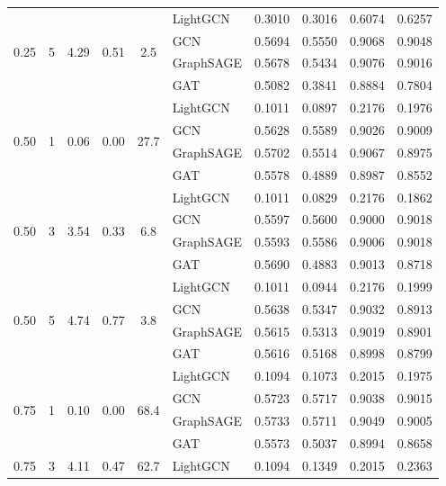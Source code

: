 {\begin{longtable}{cccccl rrrr}
\midrule
\multirow{4}{*}{0.25} & \multirow{4}{*}{5} & \multirow{4}{*}{4.29} & \multirow{4}{*}{0.51} & \multirow{4}{*}{2.5} & LightGCN & 0.3010 & 0.3016 & 0.6074 & 0.6257 \\
 & & & & & GCN & 0.5694 & 0.5550 & 0.9068 & 0.9048 \\
 & & & & & GraphSAGE & 0.5678 & 0.5434 & 0.9076 & 0.9016 \\
 & & & & & GAT & 0.5082 & 0.3841 & 0.8884 & 0.7804 \\
\midrule
\multirow{4}{*}{0.50} & \multirow{4}{*}{1} & \multirow{4}{*}{0.06} & \multirow{4}{*}{0.00} & \multirow{4}{*}{27.7} & LightGCN & 0.1011 & 0.0897 & 0.2176 & 0.1976 \\
 & & & & & GCN & 0.5628 & 0.5589 & 0.9026 & 0.9009 \\
 & & & & & GraphSAGE & 0.5702 & 0.5514 & 0.9067 & 0.8975 \\
 & & & & & GAT & 0.5578 & 0.4889 & 0.8987 & 0.8552 \\
\midrule
\multirow{4}{*}{0.50} & \multirow{4}{*}{3} & \multirow{4}{*}{3.54} & \multirow{4}{*}{0.33} & \multirow{4}{*}{6.8} & LightGCN & 0.1011 & 0.0829 & 0.2176 & 0.1862 \\
 & & & & & GCN & 0.5597 & 0.5600 & 0.9000 & 0.9018 \\
 & & & & & GraphSAGE & 0.5593 & 0.5586 & 0.9006 & 0.9018 \\
 & & & & & GAT & 0.5690 & 0.4883 & 0.9013 & 0.8718 \\
\midrule
\multirow{4}{*}{0.50} & \multirow{4}{*}{5} & \multirow{4}{*}{4.74} & \multirow{4}{*}{0.77} & \multirow{4}{*}{3.8} & LightGCN & 0.1011 & 0.0944 & 0.2176 & 0.1999 \\
 & & & & & GCN & 0.5638 & 0.5347 & 0.9032 & 0.8913 \\
 & & & & & GraphSAGE & 0.5615 & 0.5313 & 0.9019 & 0.8901 \\
 & & & & & GAT & 0.5616 & 0.5168 & 0.8998 & 0.8799 \\
\midrule
\multirow{4}{*}{0.75} & \multirow{4}{*}{1} & \multirow{4}{*}{0.10} & \multirow{4}{*}{0.00} & \multirow{4}{*}{68.4} & LightGCN & 0.1094 & 0.1073 & 0.2015 & 0.1975 \\
 & & & & & GCN & 0.5723 & 0.5717 & 0.9038 & 0.9015 \\
 & & & & & GraphSAGE & 0.5733 & 0.5711 & 0.9049 & 0.9005 \\
 & & & & & GAT & 0.5573 & 0.5037 & 0.8994 & 0.8658 \\
\midrule
\multirow{4}{*}{0.75} & \multirow{4}{*}{3} & \multirow{4}{*}{4.11} & \multirow{4}{*}{0.47} & \multirow{4}{*}{62.7} & LightGCN & 0.1094 & 0.1349 & 0.2015 & 0.2363 \\

\end{longtable}}
